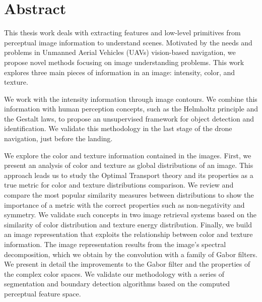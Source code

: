 \chapter*{Abstract}

\vspace*{-10ex}
\noindent This thesis work deals with extracting features and low-level primitives from perceptual image information to understand scenes. Motivated by the needs and problems in Unmanned Aerial Vehicles (UAVs) vision-based navigation, we propose novel methods focusing on image understanding problems. This work explores three main pieces of information in an image: intensity, color, and texture.
\newline 

\noindent We work with the intensity information through image contours. We combine this information with human perception concepts, such as the Helmholtz principle and the Gestalt laws, to propose an unsupervised framework for object detection and identification. We validate this methodology in the last stage of the drone navigation, just before the landing. 
\newline

\noindent We explore the color and texture information contained in the images. First, we present an analysis of color and texture as global distributions of an image. This approach leads us to study the Optimal Transport theory and its properties as a true metric for color and texture distributions comparison. We review and compare the most popular similarity measures between distributions to show the importance of a metric with the correct properties such as non-negativity and symmetry. We validate such concepts in two image retrieval systems based on the similarity of color distribution and texture energy distribution. 
\noindent Finally, we build an image representation that exploits the relationship between color and texture information. The image representation results from the image's spectral decomposition, which we obtain by the convolution with a family of Gabor filters. We present in detail the improvements to the Gabor filter and the properties of the complex color spaces. We validate our methodology with a series of segmentation and boundary detection algorithms based on the computed perceptual feature space.

